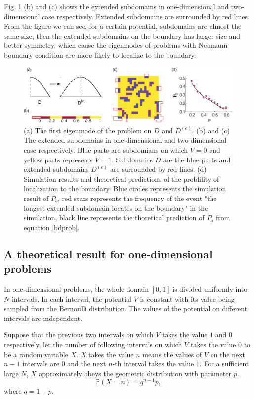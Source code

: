 \documentclass[a4paper,11pt]{article}
\begin{document}
Fig. \ref{fig3} (b) and (c) shows the extended subdomains in one-dimensional and two-dimensional case respectively. Extended subdomains are surrounded by red lines. From the figure we can see, for a certain potential, subdomains are almost the same size, then the extended subdomains on the boundary has larger size and better symmetry, which cause the eigenmodes of problems with Neumann boundary condition are more likely to localize to the boundary.

\begin{figure}
\centering
\includegraphics[width=\linewidth]{Fig3.eps}
\caption{(a) The first eigenmode of the problem on $D$ and $D^{(e)}$. (b) and (c) The extended subdomains in one-dimensional and two-dimensional case respectively. Blue parts are subdomians on which $V = 0$ and yellow parts represents $V = 1$. Subdomains $D$ are the blue parts and extended subdomains $D^{(e)}$ are surrounded by red lines. (d) Simulation results and theoretical predictions of the problility of localization to the boundary. Blue circles represents the simulation result of $P_b$, red stars represents the frequency of the event "the longest extended subdomain locates on the boundary" in the simulation, black line represents the thoretical prediction of $P_b$ from equation \eqref{bdprob}.}
\label{fig3}
\end{figure}

\subsection{A theoretical result for one-dimensional problems}

In one-dimensional problems, the whole domain $[0, 1]$ is divided uniformly into $N$ intervals. In each interval, the potential $V$ is constant with its value being sampled from the Bernoulli distribution. The values of the potential on different intervals are independent.

Suppose that the previous two intervals on which $V$ takes the value $1$ and $0$ respectively, let the number of following intervals on which $V$ takes the value $0$ to be a random variable $X$. $X$ takes the value $n$ means the values of $V$ on the next $n-1$ intervals are $0$ and the next $n$-th interval takes the value $1$. For a sufficient large $N$, $X$ approximately obeys the geometric distribution with parameter $p$.
$$ \mathbb{P}(X = n) = q^{n-1} p, $$
where $q = 1 - p$.
\end{document}
